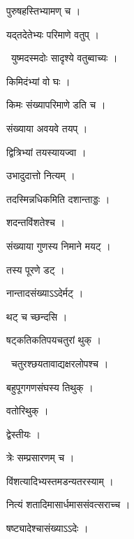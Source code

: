 \documentclass[10pt, openany, oneside]{book}
\begin{document}
\noindent पुरुषहस्तिभ्यामण् च ।

\noindent यद्तदेतेभ्यः परिमाणे वतुप् ।

\par\noindent\hspace{1.5em}{\vps वा॰}~{\qt युष्मदस्मदोः सादृश्ये वतुब्वाच्यः ।}

\noindent किमिदंभ्यां वो घः ।

\noindent किमः संख्यापरिमाणे डति च ।

\noindent संख्याया अवयवे तयप् ।

\noindent द्वित्रिभ्यां तयस्यायज्वा ।

\noindent उभादुदात्तो नित्यम् ।

\noindent तदस्मिन्नधिकमिति दशान्ताड्डः ।

\noindent शदन्तविंशतेश्च ।

\noindent संख्याया गुणस्य निमाने मयट् ।

\noindent तस्य पूरणे डट् ।

\noindent नान्तादसंख्याऽऽदेर्मट् ।

\noindent थट् च च्छन्दसि ।

\noindent षट्कतिकतिपयचतुरां थुक् ।

\par\noindent\hspace{1.5em}{\vps वा॰}~{\qt चतुरश्छयतावाद्यक्षरलोपश्च ।}

\noindent बहुपूगगणसंघस्य तिथुक् ।

\noindent वतोरिथुक् ।

\noindent द्वेस्तीयः ।

\noindent त्रेः सम्प्रसारणम् च ।

\noindent विंशत्यादिभ्यस्तमडन्यतरस्याम् ।

\noindent नित्यं शतादिमासार्धमाससंवत्सराच्च ।

\noindent षष्ट्यादेश्चासंख्याऽऽदेः ।
\end{document}
